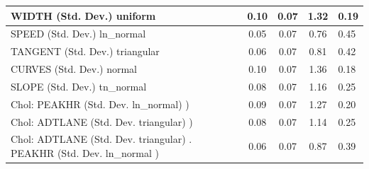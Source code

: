 \begin{table}
\begin{center}
\begin{tabular}{|l|l|c|c|c|l|}
			WIDTH (Std. Dev.) uniform &  & 0.10 & 0.07 & 1.32 & 0.19 \\
			\hline
			SPEED (Std. Dev.) ln_normal &  & 0.05 & 0.07 & 0.76 & 0.45 \\
			\hline
			TANGENT (Std. Dev.) triangular &  & 0.06 & 0.07 & 0.81 & 0.42 \\
			\hline
			CURVES (Std. Dev.) normal &  & 0.10 & 0.07 & 1.36 & 0.18 \\
			\hline
			SLOPE (Std. Dev.) tn_normal &  & 0.08 & 0.07 & 1.16 & 0.25 \\
			\hline
			 Chol: PEAKHR (Std. Dev. ln_normal) ) &  & 0.09 & 0.07 & 1.27 & 0.20 \\
			\hline
			 Chol: ADTLANE (Std. Dev. triangular) ) &  & 0.08 & 0.07 & 1.14 & 0.25 \\
			\hline
			 Chol: ADTLANE (Std. Dev. triangular) . PEAKHR (Std. Dev.   ln_normal ) &  & 0.06 & 0.07 & 0.87 & 0.39 \\
			\hline
		\end{tabular}
	\end{center}
\end{table}